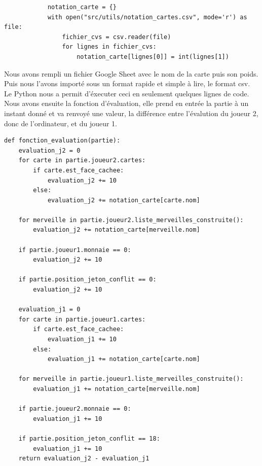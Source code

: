 \documentclass[12pt]{article}
\begin{document}
		\begin{lstlisting}
			notation_carte = {}
			with open("src/utils/notation_cartes.csv", mode='r') as file:
				fichier_cvs = csv.reader(file)
				for lignes in fichier_cvs:
					notation_carte[lignes[0]] = int(lignes[1])
		\end{lstlisting}
		
		Nous avons rempli un fichier Google Sheet avec le nom de la carte puis son poids. Puis nous l'avons importé sous un format rapide et simple à lire, le format csv. Le Python nous a permit d'éxecuter ceci en seulement quelques lignes de code. \\
		Nous avons ensuite la fonction d'évaluation, elle prend en entrée
		la partie à un instant donné et va renvoyé une valeur, la différence
		entre l'évalution du joueur 2, donc de l'ordinateur, et du joueur 1.

		\begin{lstlisting}
def fonction_evaluation(partie):
	evaluation_j2 = 0
	for carte in partie.joueur2.cartes:
		if carte.est_face_cachee:
			evaluation_j2 += 10
		else:
			evaluation_j2 += notation_carte[carte.nom]
	
	for merveille in partie.joueur2.liste_merveilles_construite():
		evaluation_j2 += notation_carte[merveille.nom]
	
	if partie.joueur1.monnaie == 0:
		evaluation_j2 += 10
					
	if partie.position_jeton_conflit == 0:
		evaluation_j2 += 10
	
	evaluation_j1 = 0
	for carte in partie.joueur1.cartes:
		if carte.est_face_cachee:
			evaluation_j1 += 10
		else:
			evaluation_j1 += notation_carte[carte.nom]
	
	for merveille in partie.joueur1.liste_merveilles_construite():
		evaluation_j1 += notation_carte[merveille.nom]
	
	if partie.joueur2.monnaie == 0:
		evaluation_j1 += 10
	
	if partie.position_jeton_conflit == 18:
		evaluation_j1 += 10
	return evaluation_j2 - evaluation_j1
		\end{lstlisting}
\end{document}
